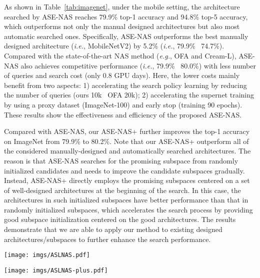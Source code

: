 \documentclass[lettersize,journal]{IEEEtran}
\newcommand{\sexyname}{ASE-NAS\xspace}
\newcommand{\sexynameplus}{ASE-NAS+\xspace}
\def\eg{\emph{e.g.}} \def\Eg{\emph{E.g.}}
\def\ie{\emph{i.e.}} \def\Ie{\emph{I.e.}}
\begin{document}
As shown in Table~\ref{tab:imagenet}, under the mobile setting, the architecture searched by \sexyname reaches 79.9\% top-1 accuracy and 94.8\% top-5 accuracy, which outperforms not only the manual designed architectures but also most automatic searched ones.
Specifically, \sexyname outperforms the best manually designed architecture (\ie, MobileNetV2) by 5.2\% (\ie, 79.9\% \vs~74.7\%).
Compared with the state-of-the-art NAS method (\eg, OFA and Cream-L), \sexyname also achieves competitive performance (\ie, 79.9\% \vs~80.0\%) with less number of queries and search cost (only 0.8 GPU days).
Here, the lower costs mainly benefit from two aspects: 1) accelerating the search policy learning by reducing the number of queries (ours 10k \vs~OFA 20k); 2) accelerating the supernet training by using a proxy dataset (ImageNet-100) and early stop (training 90 epochs).
These results show the effectiveness and efficiency of the proposed \sexyname.

Compared with \sexyname, our \sexynameplus further improves the top-1 accuracy on ImageNet from 79.9\% to 80.2\%.
Note that our \sexynameplus outperform all of the considered manually-designed and automatically searched architectures.
The reason is that \sexyname searches for the promising subspace from randomly initialized candidates and needs to improve the candidate subspaces gradually.
Instead, \sexynameplus directly employs the promising subspaces centered on a set of well-designed architectures at the beginning of the search.
In this case, the architectures in such initialized subspaces have better performance than that in randomly initialized subspaces, which accelerates the search process by providing good subspace initialization centered on the good architectures.
The results demonstrate that we are able to apply our method to existing designed architectures/subspaces to further enhance the search performance.

\begin{figure*}[t]
\centering
\texttt{[image: imgs/ASLNAS.pdf]}
\caption{
    The architecture searched by \sexyname in MobileNet-like search space.
}
\label{fig:arch_visualization}
\end{figure*}

\begin{figure*}[t]
\centering
\texttt{[image: imgs/ASLNAS-plus.pdf]}
\caption{
    The architecture searched by \sexynameplus in MobileNet-like search space.
}
\label{fig:arch_visualization_plus}
\end{figure*}
\end{document}
